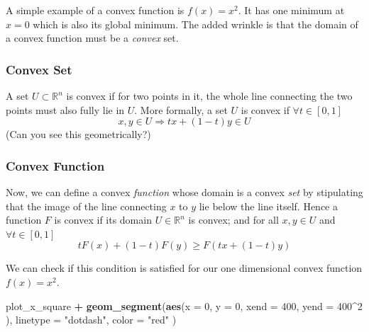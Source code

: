 \documentclass[11pt,]{article}
\newenvironment{Shaded}{\begin{snugshade}}{\end{snugshade}}
\newcommand{\KeywordTok}[1]{\textcolor[rgb]{0.13,0.29,0.53}{\textbf{#1}}}
\newcommand{\DataTypeTok}[1]{\textcolor[rgb]{0.13,0.29,0.53}{#1}}
\newcommand{\DecValTok}[1]{\textcolor[rgb]{0.00,0.00,0.81}{#1}}
\newcommand{\StringTok}[1]{\textcolor[rgb]{0.31,0.60,0.02}{#1}}
\newcommand{\OperatorTok}[1]{\textcolor[rgb]{0.81,0.36,0.00}{\textbf{#1}}}
\newcommand{\NormalTok}[1]{#1}
\begin{document}
A simple example of a convex function is \(f(x) = x^2\). It has one
minimum at \(x=0\) which is also its global minimum. The added wrinkle
is that the domain of a convex function must be a \emph{convex} set.

\subsubsection{Convex Set}\label{convex-set}

A set \(U\subset \mathbb{R}^n\) is convex if for two points in it, the
whole line connecting the two points must also fully lie in \(U\). More
formally, a set \(U\) is convex if \(\forall t\in[0,1]\) \[
x, y \in U \Rightarrow tx+(1-t)y\in U
\] (Can you see this geometrically?)

\subsubsection{Convex Function}\label{convex-function}

Now, we can define a convex \emph{function} whose domain is a convex
\emph{set} by stipulating that the image of the line connecting \(x\) to
\(y\) lie below the line itself. Hence a function \(F\) is convex if its
domain \(U\in \mathbb{R}^n\) is convex; and for all \(x, y\in U\) and
\(\forall t\in[0,1]\) \[
tF(x) + (1-t)F(y) \geq F(tx + (1-t)y)
\]

We can check if this condition is satisfied for our one dimensional
convex function \(f(x)=x^2\).

\begin{Shaded}
\begin{Highlighting}[]
\NormalTok{plot_x_square }\OperatorTok{+}\StringTok{ }
\StringTok{  }\KeywordTok{geom_segment}\NormalTok{(}\KeywordTok{aes}\NormalTok{(}\DataTypeTok{x =} \DecValTok{0}\NormalTok{, }
                   \DataTypeTok{y =} \DecValTok{0}\NormalTok{, }
                   \DataTypeTok{xend =} \DecValTok{400}\NormalTok{, }
                   \DataTypeTok{yend =} \DecValTok{400}\OperatorTok{^}\DecValTok{2}
\NormalTok{                   ), }
               \DataTypeTok{linetype =} \StringTok{"dotdash"}\NormalTok{, }
               \DataTypeTok{color =} \StringTok{"red"}
\NormalTok{               )}
\end{Highlighting}
\end{Shaded}
\end{document}
